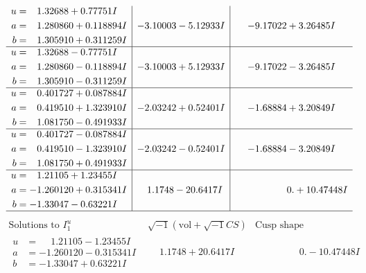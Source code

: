 \documentclass[1p]{elsarticle_modified}
\theoremstyle{definition}
\newcommand{\I}{\sqrt{-1}}
\begin{document}
$$\begin{array}{c|c|c}
\begin{aligned}
u &= \phantom{-}1.32688 + 0.77751 I \\
a &= \phantom{-}1.280860 + 0.118894 I \\
b &= \phantom{-}1.305910 + 0.311259 I\end{aligned}
 & -3.10003 - 5.12933 I & -9.17022 + 3.26485 I \\ \hline\begin{aligned}
u &= \phantom{-}1.32688 - 0.77751 I \\
a &= \phantom{-}1.280860 - 0.118894 I \\
b &= \phantom{-}1.305910 - 0.311259 I\end{aligned}
 & -3.10003 + 5.12933 I & -9.17022 - 3.26485 I \\ \hline\begin{aligned}
u &= \phantom{-}0.401727 + 0.087884 I \\
a &= \phantom{-}0.419510 + 1.323910 I \\
b &= \phantom{-}1.081750 - 0.491933 I\end{aligned}
 & -2.03242 + 0.52401 I & -1.68884 + 3.20849 I \\ \hline\begin{aligned}
u &= \phantom{-}0.401727 - 0.087884 I \\
a &= \phantom{-}0.419510 - 1.323910 I \\
b &= \phantom{-}1.081750 + 0.491933 I\end{aligned}
 & -2.03242 - 0.52401 I & -1.68884 - 3.20849 I \\ \hline\begin{aligned}
u &= \phantom{-}1.21105 + 1.23455 I \\
a &= -1.260120 + 0.315341 I \\
b &= -1.33047 - 0.63221 I\end{aligned}
 & \phantom{-}1.1748 - 20.6417 I & \phantom{-0.000000 -}0. + 10.47448 I\\
 \hline 
 \end{array}$$\newpage$$\begin{array}{c|c|c}  
\text{Solutions to }I^u_{1}& \I (\text{vol} + \sqrt{-1}CS) & \text{Cusp shape}\\
 \hline 
\begin{aligned}
u &= \phantom{-}1.21105 - 1.23455 I \\
a &= -1.260120 - 0.315341 I \\
b &= -1.33047 + 0.63221 I\end{aligned}
 & \phantom{-}1.1748 + 20.6417 I & \phantom{-0.000000 } 0. - 10.47448 I \\ \hline\begin{aligned}

\end{aligned}
\end{array}$$
\end{document}

